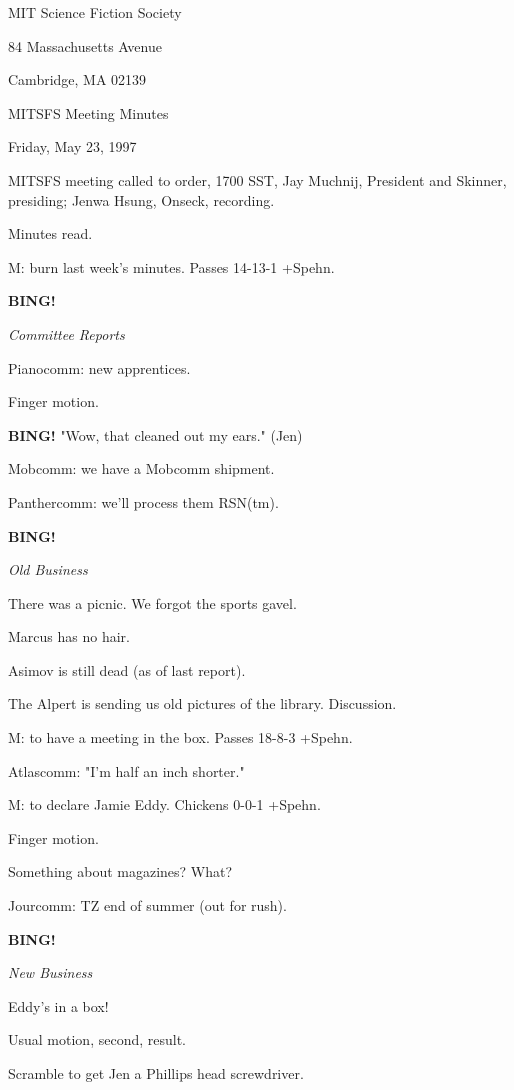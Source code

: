 \documentclass[12pt]{article}
\newcommand{\bing}{{\bf BING!} }
\newcommand{\goto}[1]{\bing \vskip 12pt \centerline{{\em{#1}}}}
\begin{document}
\begin{center}

MIT Science Fiction Society 

84 Massachusetts Avenue

Cambridge, MA 02139

\vspace{12pt}

MITSFS Meeting Minutes 

Friday, May 23, 1997

\end{center}
 
\vspace{18pt}

\setlength{\parskip}{6pt}

\noindent
MITSFS meeting called to order, 1700 SST,
Jay Muchnij, President and Skinner, presiding; Jenwa Hsung, Onseck, recording.

Minutes read.

M: burn last week's minutes. Passes 14-13-1 +Spehn.

\goto{Committee Reports}

Pianocomm: new apprentices.

Finger motion.

\bing "Wow, that cleaned out my ears." (Jen)

Mobcomm: we have a Mobcomm shipment.

Panthercomm: we'll process them RSN(tm).

\goto{Old Business}

There was a picnic. We forgot the sports gavel.

Marcus has no hair.

Asimov is still dead (as of last report).

The Alpert is sending us old pictures of the library. Discussion.

M: to have a meeting in the box. Passes 18-8-3 +Spehn.

Atlascomm: "I'm half an inch shorter."

M: to declare Jamie Eddy. Chickens 0-0-1 +Spehn.

Finger motion.

Something about magazines? What?

Jourcomm: TZ end of summer (out for rush).

\goto{New Business}

Eddy's in a box!

Usual motion, second, result.

Scramble to get Jen a Phillips head screwdriver.
\end{document}
